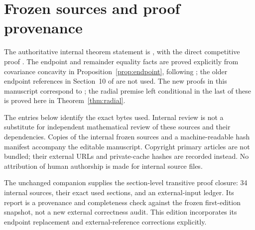 \section{Frozen sources and proof provenance}\label{app:sources}

The authoritative internal theorem statement is \cite{unconditional}, with the direct competitive proof \cite{direct}. The endpoint and remainder equality facts are proved explicitly from covariance concavity in Proposition~\ref{prop:endpoint}, following \cite{endpoint}; the older endpoint references in Section~10 of \cite{covariance} are not used. The new proofs in this manuscript correspond to \cite{hazards,radial,assembly}; the radial premise left conditional in the last of these is proved here in Theorem~\ref{thm:radial}.

The entries below identify the exact bytes used. Internal review is not a substitute for independent mathematical review of these sources and their dependencies. Copies of the internal frozen sources and a machine-readable hash manifest accompany the editable manuscript. Copyright primary articles are not bundled; their external URLs and private-cache hashes are recorded instead. No attribution of human authorship is made for internal source files.

The unchanged companion  supplies the
section-level transitive proof closure: 34 internal sources, their exact
used sections, and an external-input ledger. Its report is a provenance
and completeness check against the frozen first-edition snapshot, not a
new external correctness audit. This edition incorporates its endpoint
replacement and external-reference corrections explicitly.

\noindent{}\par
{}

\begingroup\small\sloppy


